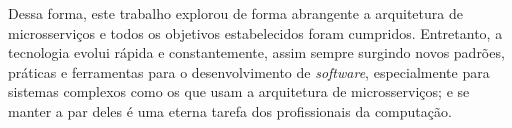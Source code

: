 Dessa forma, este trabalho explorou de forma abrangente a arquitetura de microsserviços e todos os objetivos estabelecidos foram cumpridos. Entretanto, a tecnologia evolui rápida e constantemente, assim sempre surgindo novos padrões, práticas e ferramentas para o desenvolvimento de \emph{software}, especialmente para sistemas complexos como os que usam a arquitetura de microsserviços; e se manter a par deles é uma eterna tarefa dos profissionais da computação.










